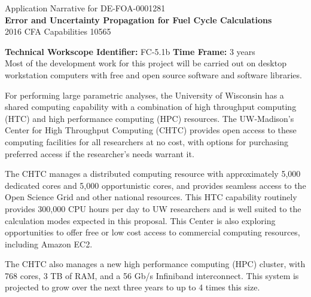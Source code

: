 \documentclass[dvips,12pt]{article}
\begin{document}
\begin{centering}
  Application Narrative for DE-FOA-0001281\\
  \textbf{\large Error and Uncertainty Propagation for Fuel Cycle Calculations}\\
  2016 CFA Capabilities 10565\\
\end{centering}
\vspace{1em}

\noindent\textbf{Technical Workscope Identifier:} FC-5.1b \hspace{1in} \textbf{Time Frame:} 3 years\\

Most of the development work for this project will be carried out on
desktop workstation computers with free and open source software and
software libraries.

For performing large parametric analyses, the University of Wisconsin
has a shared computing capability with a combination of high
throughput computing (HTC) and high performance computing (HPC)
resources.  The UW-Madison’s Center for High Throughput Computing
(CHTC) provides open access to these computing facilities for all
researchers at no cost, with options for purchasing preferred access
if the researcher’s needs warrant it.

The CHTC manages a distributed computing resource with approximately
5,000 dedicated cores and 5,000 opportunistic cores, and provides
seamless access to the Open Science Grid and other national resources.
This HTC capability routinely provides 300,000 CPU hours per day to UW
researchers and is well suited to the calculation modes expected in
this proposal.  This Center is also exploring opportunities to offer
free or low cost access to commercial computing resources, including
Amazon EC2.

The CHTC also manages a new high performance computing (HPC) cluster,
with 768 cores, 3 TB of RAM, and a 56 Gb/s Infiniband interconnect.
This system is projected to grow over the next three years to up to 4
times this size.
\end{document}
